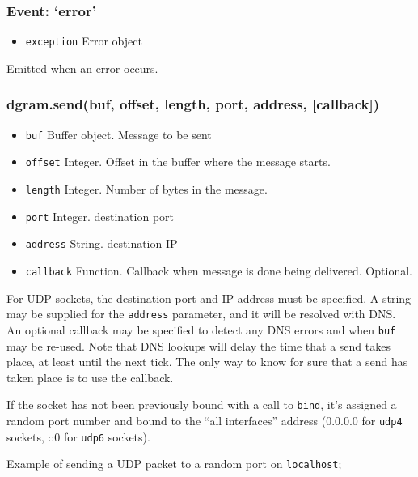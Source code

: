 \subsubsection{Event: `error'}

\begin{itemize}
\item
  \texttt{exception} Error object
\end{itemize}

Emitted when an error occurs.

\subsubsection{dgram.send(buf, offset, length, port, address,
{[}callback{]})}

\begin{itemize}
\item
  \texttt{buf} Buffer object. Message to be sent
\item
  \texttt{offset} Integer. Offset in the buffer where the message
  starts.
\item
  \texttt{length} Integer. Number of bytes in the message.
\item
  \texttt{port} Integer. destination port
\item
  \texttt{address} String. destination IP
\item
  \texttt{callback} Function. Callback when message is done being
  delivered. Optional.
\end{itemize}

For UDP sockets, the destination port and IP address must be specified.
A string may be supplied for the \texttt{address} parameter, and it will
be resolved with DNS. An optional callback may be specified to detect
any DNS errors and when \texttt{buf} may be re-used. Note that DNS
lookups will delay the time that a send takes place, at least until the
next tick. The only way to know for sure that a send has taken place is
to use the callback.

If the socket has not been previously bound with a call to
\texttt{bind}, it's assigned a random port number and bound to the ``all
interfaces'' address (0.0.0.0 for \texttt{udp4} sockets, ::0 for
\texttt{udp6} sockets).

Example of sending a UDP packet to a random port on \texttt{localhost};

